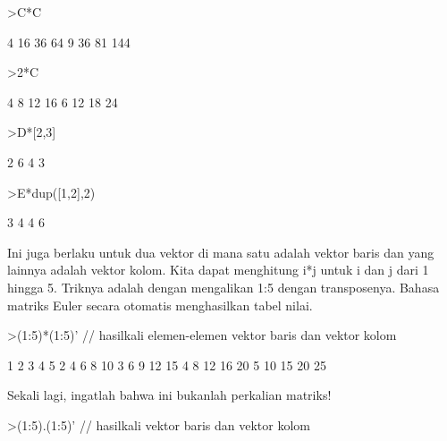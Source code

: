 \documentclass[a4paper,10pt]{article}
\begin{document}
\begin{eulernotebook}
\begin{eulercomment}
\begin{eulercomment}
\begin{eulerprompt}
>C*C
\end{eulerprompt}
\begin{euleroutput}
              4            16            36            64 
              9            36            81           144 
\end{euleroutput}
\begin{eulerprompt}
>2*C
\end{eulerprompt}
\begin{euleroutput}
              4             8            12            16 
              6            12            18            24 
\end{euleroutput}
\begin{eulerprompt}
>D*[2,3]
\end{eulerprompt}
\begin{euleroutput}
              2             6 
              4             3 
\end{euleroutput}
\begin{eulerprompt}
>E*dup([1,2],2)
\end{eulerprompt}
\begin{euleroutput}
              3             4 
              4             6 
\end{euleroutput}
\begin{eulercomment}
Ini juga berlaku untuk dua vektor di mana satu adalah vektor baris dan
yang lainnya adalah vektor kolom. Kita dapat menghitung i*j untuk i
dan j dari 1 hingga 5. Triknya adalah dengan mengalikan 1:5 dengan
transposenya. Bahasa matriks Euler secara otomatis menghasilkan tabel
nilai.
\end{eulercomment}
\begin{eulerprompt}
>(1:5)*(1:5)' // hasilkali elemen-elemen vektor baris dan vektor kolom
\end{eulerprompt}
\begin{euleroutput}
              1             2             3             4             5 
              2             4             6             8            10 
              3             6             9            12            15 
              4             8            12            16            20 
              5            10            15            20            25 
\end{euleroutput}
\begin{eulercomment}
Sekali lagi, ingatlah bahwa ini bukanlah perkalian matriks!
\end{eulercomment}
\begin{eulerprompt}
>(1:5).(1:5)' // hasilkali vektor baris dan vektor kolom

\end{eulerprompt}
\end{eulercomment}
\end{eulercomment}
\end{eulernotebook}
\end{document}
